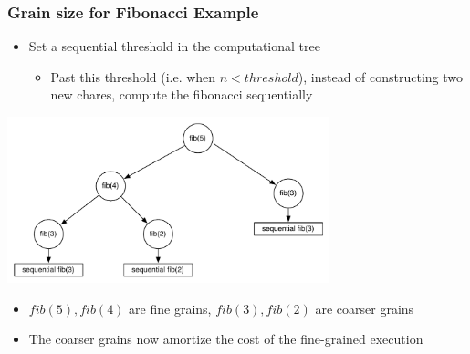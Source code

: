 \begin{frame}[fragile]
  \frametitle{Grain size for Fibonacci Example}
  \begin{itemize}
  \item Set a sequential threshold in the computational tree
    \begin{itemize}
    \item Past this threshold (i.e. when $n < threshold$), instead of
      constructing two new chares, compute the fibonacci sequentially
    \end{itemize}
  \end{itemize}
  \begin{center} \includegraphics[width=0.7\textwidth]{figures/tree-threshold.pdf} \end{center}
  \begin{itemize}
    \item $fib(5), fib(4)$ are fine grains, $fib(3), fib(2)$ are coarser grains
    \item The coarser grains now amortize the cost of the fine-grained execution
  \end{itemize}
\end{frame}

%   
